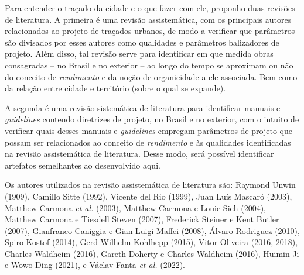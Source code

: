 \documentclass[12pt, a4paper]{book} %
\begin{document}
        Para entender o traçado da cidade e o que fazer com ele, proponho duas revisões de literatura. A primeira é uma revisão assistemática, com os principais autores relacionados ao projeto de traçados urbanos, de modo a verificar que parâmetros são divisados por esses autores como qualidades e parâmetros balizadores de projeto. Além disso, tal revisão serve para identificar em que medida obras consagradas – no Brasil e no exterior – ao longo do tempo se aproximam ou não do conceito de \textit{rendimento} e da noção de organicidade a ele associada. Bem como da relação entre cidade e território (sobre o qual se expande).

        A segunda é uma revisão sistemática de literatura para identificar manuais e \textit{guidelines} contendo diretrizes de projeto, no Brasil e no exterior, com o intuito de verificar quais desses manuais e \textit{guidelines} empregam parâmetros de projeto que possam ser relacionados ao conceito de \textit{rendimento} e às qualidades identificadas na revisão assistemática de literatura. Desse modo, será possível identificar artefatos semelhantes ao desenvolvido aqui.

        Os autores utilizados na revisão assistemática de literatura são: Raymond Unwin (1909), Camillo Sitte (1992), Vicente del Rio (1999), Juan Luís Mascaró (2003), Matthew Carmona \textit{et al.} (2003), Matthew Carmona e Louie Sieh (2004), Matthew Carmona e Tiesdell Steven (2007), Frederick Steiner e Kent Butler (2007), Gianfranco Caniggia e Gian Luigi Maffei (2008), Álvaro Rodriguez (2010), Spiro Kostof (2014), Gerd Wilhelm Kohlhepp (2015), Vitor Oliveira (2016, 2018), Charles Waldheim (2016), Gareth Doherty e Charles Waldheim (2016), Huimin Ji e Wowo Ding (2021), e Václav Fanta \textit{et al.} (2022).
\end{document}
